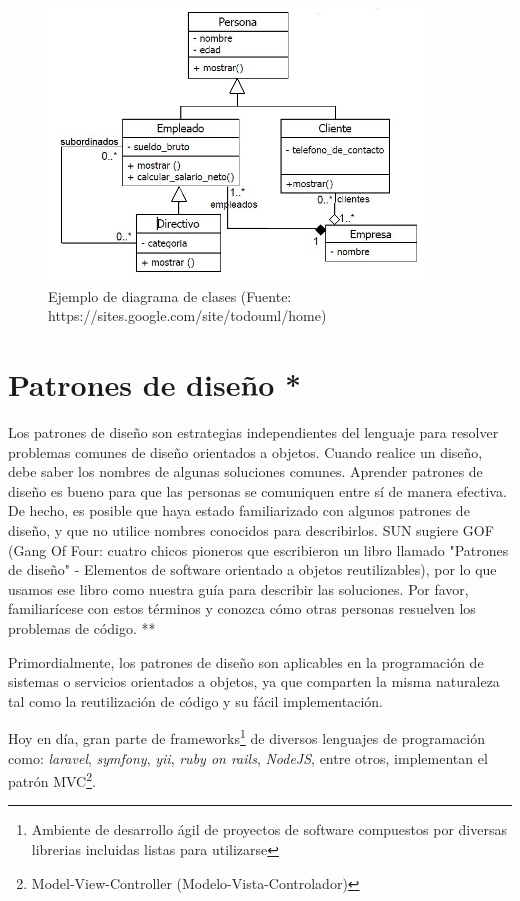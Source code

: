 \begin{figure}[!ht]
    \centering
    \includegraphics[width=10cm]{figures/diagrama_clases.jpg} %
    \caption{Ejemplo de diagrama de clases (Fuente: https://sites.google.com/site/todouml/home)} %
    \label{diagrama_clases}
\end{figure}

\section{Patrones de diseño *}

 Los patrones de diseño son estrategias independientes del lenguaje para resolver problemas comunes de diseño orientados a objetos. Cuando realice un diseño, debe saber los nombres de algunas soluciones comunes. Aprender patrones de diseño es bueno para que las personas se comuniquen entre sí de manera efectiva. De hecho, es posible que haya estado familiarizado con algunos patrones de diseño, y que no utilice nombres conocidos para describirlos. SUN sugiere GOF (Gang Of Four: cuatro chicos pioneros que escribieron un libro llamado "Patrones de diseño" - Elementos de software orientado a objetos reutilizables), por lo que usamos ese libro como nuestra guía para describir las soluciones. Por favor, familiarícese con estos términos y conozca cómo otras personas resuelven los problemas de código. **\newline
 
 Primordialmente, los patrones de diseño son aplicables en la programación de sistemas o servicios orientados a objetos, ya que comparten la misma naturaleza tal como la reutilización de código y su fácil implementación. \newline
 
 Hoy en día, gran parte de frameworks\footnote{Ambiente de desarrollo ágil de proyectos de software compuestos por diversas librerias incluidas listas para utilizarse} de diversos lenguajes de programación como: \textit{laravel}, \textit{symfony}, \textit{yii}, \textit{ruby on rails}, \textit{NodeJS}, entre otros, implementan el patrón MVC\footnote{Model-View-Controller (Modelo-Vista-Controlador)}.
 
